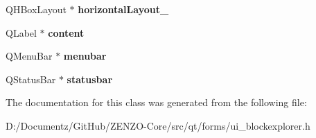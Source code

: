 \begin{DoxyCompactItemize}
Q\+H\+Box\+Layout $\ast$ {\bfseries horizontal\+Layout\+\_}
\item 
\mbox{\label{class_ui___block_explorer_a71d5c5cfaf5ff6bc319673f18afa639d}} 
Q\+Label $\ast$ {\bfseries content}
\item 
\mbox{\label{class_ui___block_explorer_abe0c818a4cd2d3e6c4810949b1c813a6}} 
Q\+Menu\+Bar $\ast$ {\bfseries menubar}
\item 
\mbox{\label{class_ui___block_explorer_ae218d3c447ad2dafe1ac6c75a7ddb98c}} 
Q\+Status\+Bar $\ast$ {\bfseries statusbar}
\end{DoxyCompactItemize}


The documentation for this class was generated from the following file\+:\begin{DoxyCompactItemize}
\item 
D\+:/\+Documentz/\+Git\+Hub/\+Z\+E\+N\+Z\+O-\/\+Core/src/qt/forms/ui\+\_\+blockexplorer.\+h\end{DoxyCompactItemize}

